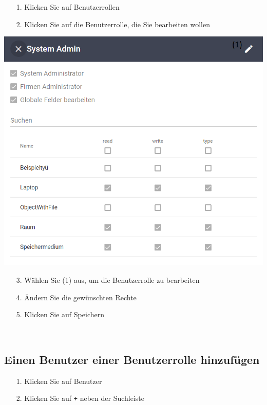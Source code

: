 \documentclass[11pt,a4paper]{report}
\begin{document}
	\begin{itemize}
		\item[1.] Klicken Sie auf \glqq{}Benutzerrollen\grqq{}
		\item[2.] Klicken Sie auf die Benutzerrolle, die Sie bearbeiten wollen
	\end{itemize}

	\begin{minipage}{0.5\linewidth}
	\includegraphics[width=\linewidth]{Rollenedit.png}
	\end{minipage}
	\hfill
	\begin{minipage}{0.4\linewidth}
	\begin{itemize}
		\item[3.] Wählen Sie (1) aus, um die Benutzerrolle zu bearbeiten
		\item[4.] Ändern Sie die gewünschten Rechte
		\item[5.] Klicken Sie auf Speichern
	\end{itemize}
	\end{minipage}\\

	\subsection{Einen Benutzer einer Benutzerrolle hinzufügen}
	
	\begin{itemize}
		\item[1.] Klicken Sie auf \glqq{}Benutzer\grqq{}
		\item[2.] Klicken Sie auf \texttt{+} neben der Suchleiste
	\end{itemize}
\end{document}
